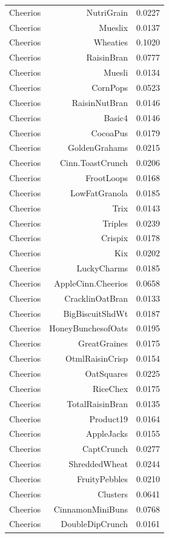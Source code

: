 \begin{longtable}{@{}lrr@{}}
Cheerios & NutriGrain & 0.0227 \\
Cheerios & Mueslix & 0.0137 \\
Cheerios & Wheaties & 0.1020 \\
Cheerios & RaisinBran & 0.0777 \\
Cheerios & Muesli & 0.0134 \\
Cheerios & CornPops & 0.0523 \\
Cheerios & RaisinNutBran & 0.0146 \\
Cheerios & Basic4 & 0.0146 \\
Cheerios & CocoaPus & 0.0179 \\
Cheerios & GoldenGrahams & 0.0215 \\
Cheerios & Cinn.ToastCrunch & 0.0206 \\
Cheerios & FrootLoops & 0.0168 \\
Cheerios & LowFatGranola & 0.0185 \\
Cheerios & Trix & 0.0143 \\
Cheerios & Triples & 0.0239 \\
Cheerios & Crispix & 0.0178 \\
Cheerios & Kix & 0.0202 \\
Cheerios & LuckyCharms & 0.0185 \\
Cheerios & AppleCinn.Cheerios & 0.0658 \\
Cheerios & CracklinOatBran & 0.0133 \\
Cheerios & BigBiscuitShdWt & 0.0187 \\
Cheerios & HoneyBunchesofOats & 0.0195 \\
Cheerios & GreatGraines & 0.0175 \\
Cheerios & OtmlRaisinCrisp & 0.0154 \\
Cheerios & OatSquares & 0.0225 \\
Cheerios & RiceChex & 0.0175 \\
Cheerios & TotalRaisinBran & 0.0135 \\
Cheerios & Product19 & 0.0164 \\
Cheerios & AppleJacks & 0.0155 \\
Cheerios & CaptCrunch & 0.0277 \\
Cheerios & ShreddedWheat & 0.0244 \\
Cheerios & FruityPebbles & 0.0210 \\
Cheerios & Clusters & 0.0641 \\
Cheerios & CinnamonMiniBuns & 0.0768 \\
Cheerios & DoubleDipCrunch & 0.0161 \\

\end{longtable}
